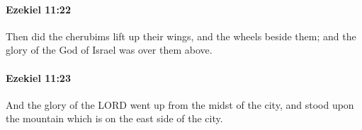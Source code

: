 		\paragraph{Ezekiel 11:22} %
			\label{EZEKIEL-11-22}

			Then did the cherubims lift up their wings, and the wheels beside them; and the glory of the God of Israel was over them above.


		\paragraph{Ezekiel 11:23} %
			\label{EZEKIEL-11-23}

			And the glory of the LORD went up from the midst of the city, and stood upon the mountain which is on the east side of the city.



